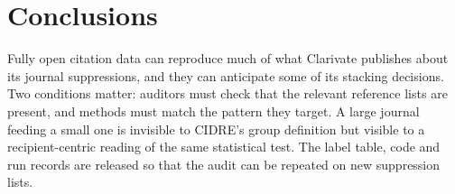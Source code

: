 \section{Conclusions}\label{sec:conclusions}
Fully open citation data can reproduce much of what Clarivate publishes about its journal suppressions, and they can
anticipate some of its stacking decisions. Two conditions matter: auditors must check that the relevant reference
lists are present, and methods must match the pattern they target. A large journal feeding a small one is invisible to
CIDRE's group definition but visible to a recipient-centric reading of the same statistical test. The
label table, code and run records are released so that the audit can be repeated on new suppression lists.
